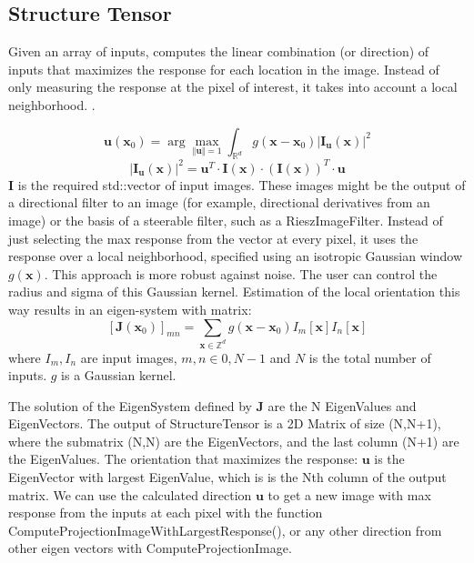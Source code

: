 \subsection{Structure Tensor}
\label{sub:structure_tensor_impl}

Given an array of inputs,  \cite{unser_steerable_2011} computes the linear combination (or direction) of inputs that maximizes the response for each location in the image. Instead of only measuring the response at the pixel of interest, it takes into account a local neighborhood. \cite{unser_steerable_2011}.

$$
 \mathbf{u}({\mathbf{x}_0}) = \arg \max_{\Vert\mathbf{u}\Vert =1 }  \int_{\mathbb{R}^d} g(\mathbf{x} - \mathbf{x}_0) \left| \mathbf{I}_{\mathbf{u}}(\mathbf{x})\right|^2
$$
$$
 \left| \mathbf{I}_{\mathbf{u}}(\mathbf{x})\right|^2 =
 \mathbf{u}^T \cdot \mathbf{I}(\mathbf{x}) \cdot (\mathbf{I}(\mathbf{x}))^T \cdot \mathbf{u}
$$
 $ \mathbf{I}$ is the required std::vector of input images. These images might be the output of a directional filter to an image
 (for example, directional derivatives from an image) or the basis of a steerable filter, such as a RieszImageFilter.
 Instead of just selecting the max response from the vector at every pixel, it uses the response over
 a local neighborhood, specified using an isotropic Gaussian window $g(\mathbf{x})$.
 This approach is more robust against noise. The user can control the radius and sigma of this Gaussian kernel.
 Estimation of the local orientation this way results in an eigen-system with matrix:
 $$
 [\mathbf{J}(\mathbf{x}_0)]_{mn} = \sum_{\mathbf{x} \in \mathbb{Z}^d} g(\mathbf{x} - \mathbf{x}_0) I_m[\mathbf{x}]I_n[\mathbf{x}]
 $$
 where $I_m, I_n $ are input images, $ m,n \in {0,N-1} $ and $N$ is the total number of inputs.
 $g$ is a Gaussian kernel.

 The solution of the EigenSystem defined by $\mathbf{J}$ are the N EigenValues and EigenVectors.
 The output of StructureTensor is a 2D Matrix of size (N,N+1), where the submatrix (N,N) are the EigenVectors, and the last column (N+1) are the EigenValues.
 The orientation that maximizes the response: $\bm{u}$ is the EigenVector with largest EigenValue, which is is the Nth column of the output matrix.
 We can use the calculated direction $\bm{u}$ to get a new image with max response from the inputs at each pixel with the function ComputeProjectionImageWithLargestResponse(),
 or any other direction from other eigen vectors with ComputeProjectionImage.

